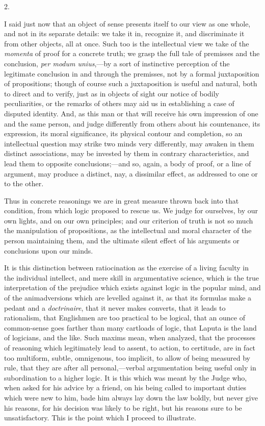 2.

I said just now that an object of sense presents itself to our view
as one whole, and not in its separate details: we take it in,
recognize it, and discriminate it from other objects, all at once.
Such too is the intellectual view we take of the \emph{momenta} of
proof for a concrete truth; we grasp the full tale of premisses and
the conclusion, \emph{per modum unius},—by a sort of instinctive
perception of the legitimate conclusion in and through the premisses,
not by a formal juxtaposition of propositions; though of course
such a juxtaposition is useful and natural, both to direct and to
verify, just as in objects of sight our notice of bodily
peculiarities, or the remarks of others may aid us in establishing a
case of disputed identity. And, as this man or that will receive his
own impression of one and the same person, and judge differently from
others about his countenance, its expression, its moral significance,
its physical contour and completion, so an intellectual question may
strike two minds very differently, may awaken in them distinct
associations, may be invested by them in contrary characteristics, and
lead them to opposite conclusions;—and so, again, a body of proof,
or a line of argument, may produce a distinct, nay, a dissimilar
effect, as addressed to one or to the other.

Thus in concrete reasonings we are in great measure thrown back
into that condition, from which logic proposed to rescue us. We judge
for ourselves, by our own lights, and on our own principles; and our
criterion of truth is not so much the manipulation of propositions, as
the intellectual and moral character of the person maintaining them,
and the ultimate silent effect of his arguments or conclusions upon
our minds.

It is this distinction between ratiocination as the exercise of a
living faculty in the individual intellect, and mere skill in
argumentative science, which is the true interpretation of the
prejudice which exists against logic in the popular mind, and of the
animadversions which are levelled against it, as that its formulas
make a pedant and a \emph{doctrinaire}, that it never makes converts,
that it leads to rationalism, that Englishmen are too practical
to be logical, that an ounce of common-sense goes farther than many
cartloads of logic, that Laputa is the land of logicians, and the
like. Such maxims mean, when analyzed, that the processes of reasoning
which legitimately lead to assent, to action, to certitude, are in
fact too multiform, subtle, omnigenous, too implicit, to allow of
being measured by rule, that they are after all personal,—verbal
argumentation being useful only in subordination to a higher logic. It
is this which was meant by the Judge who, when asked for his advice by
a friend, on his being called to important duties which were new to
him, bade him always lay down the law boldly, but never give his
reasons, for his decision was likely to be right, but his reasons sure
to be unsatisfactory. This is the point which I proceed to illustrate.

